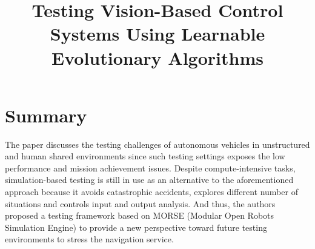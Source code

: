 \documentclass[10pt,a4paper]{report}
\title{Testing Vision-Based Control Systems Using Learnable Evolutionary Algorithms}
\begin{document}
\begin{center}
\textbf{\thetitle}
\end{center}


\section{Summary}
The paper discusses the testing challenges of autonomous vehicles in unstructured and human shared environments since such testing settings exposes the low performance and mission achievement issues. 
%
Despite compute-intensive tasks, simulation-based testing is still in use as an alternative to the aforementioned approach because it avoids catastrophic accidents, explores different number of situations and controls input and output analysis.
%
And thus, the authors proposed a testing framework based on MORSE (Modular Open Robots Simulation Engine) to provide a new perspective toward future testing environments to stress the navigation service.
%
\end{document}
